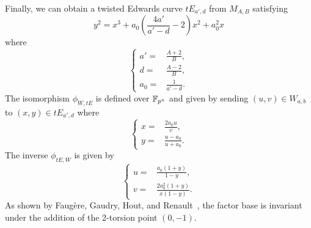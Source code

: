Finally, we can  obtain a twisted Edwards curve $tE_{a',d}$ from
$M_{A,B}$ satisfying
\[ y^2 = x^3 + a_0(\frac{4a'}{a' - d} - 2)x^2 + a_0^2x \]
where 
\[ \left\{\begin{aligned}
a' = & \frac{A + 2}{B}, \\
d = & \frac{A - 2}{B}, \\
a_0 = & \frac{1}{a' - d}.
\end{aligned}\right. \]
%
The isomorphism $\phi_{W,tE}$ is defined over $\mathbb F_{p^n}$ and given by
sending $(u,v)\in W_{a,b}$ to $(x,y)\in tE_{a',d}$ where
\[ \left\{\begin{aligned}
x = & \frac{2a_0u}{v}, \\
y = & \frac{u - a_0}{u + a_0}.
\end{aligned}\right. \]
%
The inverse $\phi_{tE,W}$ is given by
\[ \left\{\begin{aligned}
u = & \frac{a_0(1 + y)}{1 - y}, \\
v = & \frac{2a_0^2(1 + y)}{x(1 - y)}.
\end{aligned}\right. \]
%
As shown by Faug\`ere, Gaudry, Hout, and
Renault~\cite{DBLP:conf/eurocrypt/FaugereHJRV14}, the factor base is
invariant under the addition of the 2-torsion point $(0,-1)$.
